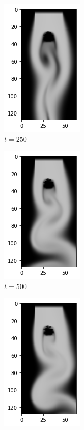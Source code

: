 \documentclass[a4paper,12pt,twoside]{report}
\begin{document}
\begin{figure}
	\centering
	\begin{subfigure}{0.18\textwidth}
		\centering
		\includegraphics[scale=0.5]{karmanflow/lpips_density_000250.png}
		\caption{$t=250$}
	\end{subfigure}
	\begin{subfigure}{0.18\textwidth}
		\centering
		\includegraphics[scale=0.5]{karmanflow/lpips_density_000500.png}
		\caption{$t=500$}
	\end{subfigure}
	\begin{subfigure}{0.18\textwidth}
		\centering
		\includegraphics[scale=0.5]{karmanflow/lpips_density_001000.png}

\end{subfigure}
\end{figure}
\end{document}
